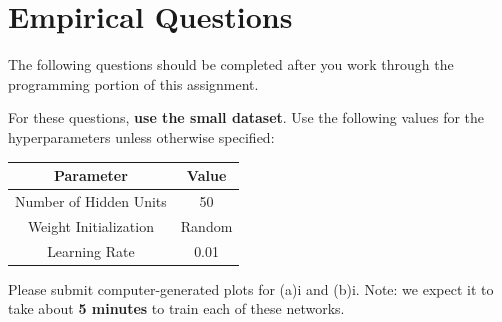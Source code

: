 \documentclass[11pt,addpoints,answers]{exam}
\begin{document}
\begin{questions}

\end{questions}

\clearpage
\newpage

\clearpage
\section{Empirical Questions}
\label{sec:interp}

The following questions should be completed after you work through the programming portion of this assignment.

For these questions, \textbf{use the small dataset}. Use the following values for the hyperparameters unless otherwise specified:

\begin{center}
    \begin{tabular}{|c|c|}
        \hline
        \textbf{Parameter} & \textbf{Value} \\
        \hline
        Number of Hidden Units & 50 \\
        \hline
        Weight Initialization & {\sc Random} \\
        \hline
        Learning Rate & 0.01 \\
        \hline
    \end{tabular}
\end{center}


Please submit computer-generated plots for (a)i and (b)i. Note: we expect it to take about \textbf{5 minutes} to train each of these networks.
\end{document}
